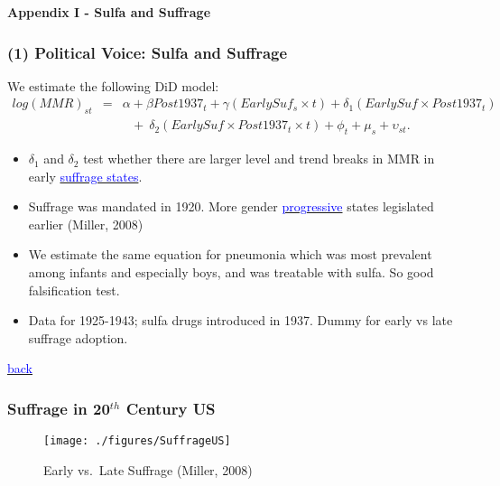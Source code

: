 \documentclass[9pt,letterpaper,subeqn]{beamer}
\begin{document}
\begin{frame}[plain]
\begin{center}
\textbf{Appendix I - Sulfa and Suffrage}
\end{center}
\end{frame}
\begin{frame}[label=sulfDD]
\frametitle{(1) Political Voice: Sulfa and Suffrage}
We estimate the following DiD model:
{\scriptsize
\begin{eqnarray}
log(MMR)_{st} & = &\alpha + \beta Post1937_t + \gamma(EarlySuf_{s}\times t)
                + \delta_1 (EarlySuf\times Post1937_t) \nonumber \\
              & &\ \ \ + \ \delta_2 (EarlySuf\times Post1937_t\times t) + \phi_t + \mu_s
                + \upsilon_{st}. \nonumber
\end{eqnarray}
}
\begin{itemize}
\setlength{\itemsep}{10pt}
  \item $\delta_1$ and $\delta_2$ test whether there are larger level and trend 
        breaks in MMR in early  \hyperlink{SuffrageUS}{\textcolor{blue}{suffrage states}}.
  \item Suffrage was mandated in 1920.  More gender \hyperlink{WhySuffrage}{\textcolor{blue}{progressive}} states legislated
        earlier (Miller, 2008)
  \item We estimate the same equation for pneumonia which was most prevalent 
        among infants and especially boys, and was treatable with sulfa. So good 
        falsification test.
  \item Data for 1925-1943; sulfa drugs introduced in 1937. Dummy for early vs 
        late suffrage adoption.
\end{itemize}
{\footnotesize \hyperlink{USAHistory}{\textcolor{blue}{back}}}
\end{frame}

\begin{frame}[plain,label=SuffrageUS]
\frametitle{Suffrage in 20$^{th}$ Century US}
\begin{figure}[h!]
\centering
\texttt{[image: ./figures/SuffrageUS]}
\caption{Early vs.\ Late Suffrage (Miller, 2008)}
\end{figure}
\end{frame}
\end{document}
